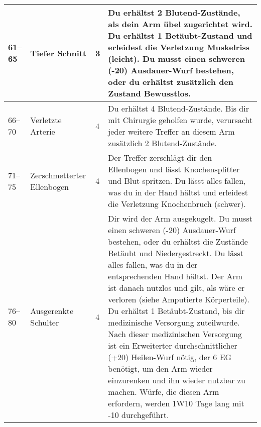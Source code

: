 \documentclass[a4paper, fontsize=8.5pt]{scrartcl}
\begin{document}
\begin{table}[!ht]
\begin{tabularx}{\textwidth}{lp{2.5cm}lX}
        61–65         & Tiefer Schnitt             & 3           & Du erhältst 2 Blutend-Zustände, als dein Arm übel zugerichtet wird. Du erhältst 1 Betäubt-Zustand und erleidest die Verletzung Muskelriss (leicht). Du musst einen schweren (-20) Ausdauer-Wurf bestehen, oder du erhältst zusätzlich den Zustand Bewusstlos.                                                                                                                                                                                                                                                                                                                                                                                              \\ \hline
        66–70         & Verletzte Arterie          & 4           & Du erhältst 4 Blutend-Zustände. Bis dir mit Chirurgie geholfen wurde, verursacht jeder weitere Treffer an diesem Arm zusätzlich 2 Blutend-Zustände.                                                                                                                                                                                                                                                                                                                                                                                                                                                                                                        \\ \hline
        71–75         & Zerschmetterter Ellenbogen & 4           & Der Treffer zerschlägt dir den Ellenbogen und lässt Knochensplitter und Blut spritzen. Du lässt alles fallen, was du in der Hand hältst und erleidest die Verletzung Knochenbruch (schwer).                                                                                                                                                                                                                                                                                                                                                                                                                                                                \\ \hline
        76–80         & Ausgerenkte Schulter       & 4           & Dir wird der Arm ausgekugelt. Du musst einen schweren (-20) Ausdauer-Wurf bestehen, oder du erhältst die Zustände Betäubt und Niedergestreckt. Du lässt alles fallen, was du in der entsprechenden Hand hältst. Der Arm ist danach nutzlos und gilt, als wäre er verloren (siehe Amputierte Körperteile). Du erhältst 1 Betäubt-Zustand, bis dir medizinische Versorgung zuteilwurde. Nach dieser medizinischen Versorgung ist ein Erweiterter durchschnittlicher (+20) Heilen-Wurf nötig, der 6 EG benötigt, um den Arm wieder einzurenken und ihn wieder nutzbar zu machen. Würfe, die diesen Arm erfordern, werden 1W10 Tage lang mit -10 durchgeführt. \\ \hline

\end{tabularx}
\end{table}
\end{document}
